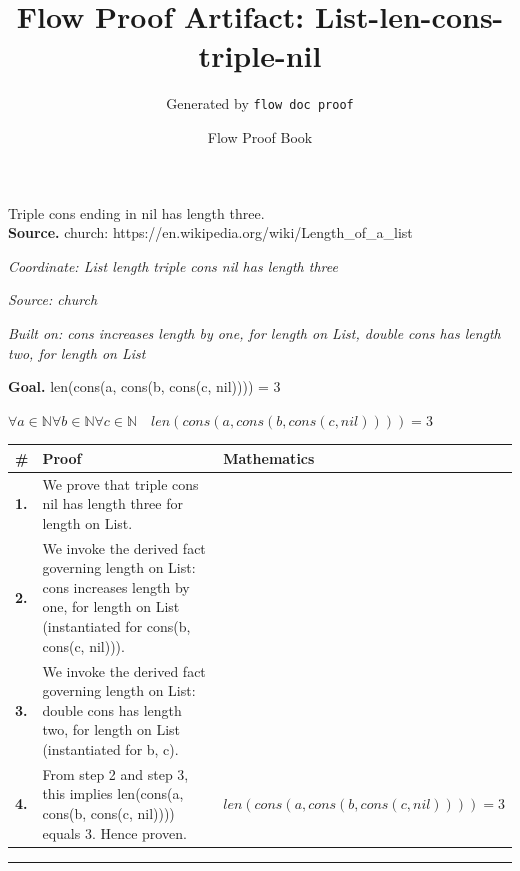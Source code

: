 \documentclass[11pt]{article}
\title{Flow Proof Artifact: List-len-cons-triple-nil}
\author{Generated by \texttt{flow doc proof}}
\date{Flow Proof Book}
\theoremstyle{definition}
\begin{document}
\maketitle
Triple cons ending in nil has length three.\\[0.5em]
\textbf{Source.} church: https://en.wikipedia.org/wiki/Length\_of\_a\_list\\[0.5em]
\bigskip
{}\par
\smallskip\noindent\textit{Coordinate: List \cdot length \cdot triple cons nil has length three}\par
\smallskip\noindent\textit{Source: church}\par
\smallskip\noindent\textit{Built on: cons increases length by one, for length on List, double cons has length two, for length on List}\par
\medskip
\noindent\textbf{Goal.} len(cons(a, cons(b, cons(c, nil)))) = 3\par
\noindent$\displaystyle \forall a \in \mathbb{N} \forall b \in \mathbb{N} \forall c \in \mathbb{N}\quad len(cons(a, cons(b, cons(c, nil)))) = 3$\par
\medskip
\noindent
\begin{tabular}{@{} >{\raggedright\arraybackslash}p{} >{\raggedright\arraybackslash}p{} >{\raggedleft\arraybackslash}p{} @{}}
\textbf{\#} & \textbf{Proof} & \textbf{Mathematics} \\
\midrule
\textbf{1.} & We prove that triple cons nil has length three for length on List. & \\[0.45em]
\textbf{2.} & We invoke the derived fact governing length on List: cons increases length by one, for length on List (instantiated for cons(b, cons(c, nil))). & \\[0.45em]
\textbf{3.} & We invoke the derived fact governing length on List: double cons has length two, for length on List (instantiated for b, c). & \\[0.45em]
\textbf{4.} & From step 2 and step 3, this implies len(cons(a, cons(b, cons(c, nil)))) equals 3. Hence proven. & $\displaystyle len(cons(a, cons(b, cons(c, nil)))) = 3$ \\[0.45em]
\bottomrule
\end{tabular}
\label{thm:List-length-triple_cons_nil_has_length_three}
\par\medskip\hrule
\end{document}
